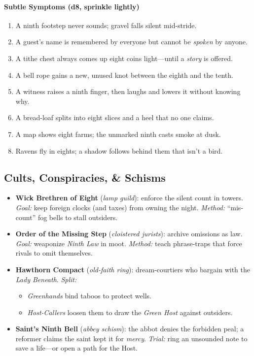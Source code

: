 \paragraph{Subtle Symptoms (d8, sprinkle lightly)}
\begin{enumerate}
  \item A ninth footstep never sounds; gravel falls silent mid-stride. 
  \item A guest’s name is remembered by everyone but cannot be \emph{spoken} by anyone. 
  \item A tithe chest always comes up eight coins light—until a \emph{story} is offered. 
  \item A bell rope gains a new, unused knot between the eighth and the tenth. 
  \item A witness raises a ninth finger, then laughs and lowers it without knowing why. 
  \item A bread-loaf splits into eight slices and a heel that no one claims. 
  \item A map shows eight farms; the unmarked ninth casts smoke at dusk. 
  \item Ravens fly in eights; a shadow follows behind them that isn’t a bird.
\end{enumerate}

\subsection*{Cults, Conspiracies, \& Schisms}
\begin{itemize}
  \item \textbf{Wick Brethren of Eight} (\emph{lamp guild}): enforce the silent count in towers. \emph{Goal:} keep foreign clocks (and taxes) from owning the night. \emph{Method:} “mis-count” fog bells to stall outsiders.
  \item \textbf{Order of the Missing Step} (\emph{cloistered jurists}): archive omissions as law. \emph{Goal:} weaponize \emph{Ninth Law} in moot. \emph{Method:} teach phrase-traps that force rivals to omit themselves.
  \item \textbf{Hawthorn Compact} (\emph{old-faith ring}): dream-courtiers who bargain with the \emph{Lady Beneath}. \emph{Split:}  
    \begin{itemize}
      \item \emph{Greenhands} bind taboos to protect wells.  
      \item \emph{Host-Callers} loosen them to draw the \emph{Green Host} against outsiders.
    \end{itemize}
  \item \textbf{Saint’s Ninth Bell} (\emph{abbey schism}): the abbot denies the forbidden peal; a reformer claims the saint kept it for \emph{mercy}. \emph{Trial:} ring an unsounded note to save a life—or open a path for the Host.
\end{itemize}

